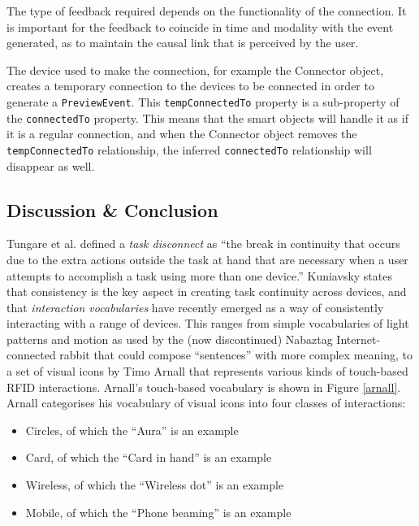 The type of feedback required depends on the functionality of the connection. It is important for the feedback to coincide in time and modality with the event generated, as to maintain the causal link that is perceived by the user.

The device used to make the connection, for example the Connector object, creates a temporary connection to the devices to be connected in order to generate a \texttt{PreviewEvent}. This \texttt{tempConnectedTo} property is a sub-property of the \texttt{connectedTo} property. This means that the smart objects will handle it as if it is a regular connection, and when the Connector object removes the \texttt{tempConnectedTo} relationship, the inferred \texttt{connectedTo} relationship will disappear as well.


\subsection{Discussion \& Conclusion}

Tungare et al. \cite{Tungare2007} defined a \emph{task disconnect} as ``the break in continuity that occurs due to the extra actions outside the task at hand that are necessary when a user attempts to accomplish a task using more than one device.'' Kuniavsky \cite{Kuniavsky} states that consistency is the key aspect in creating task continuity across devices, and that \emph{interaction vocabularies} have recently emerged as a way of consistently interacting with a range of devices. This ranges from simple vocabularies of light patterns and motion as used by the (now discontinued) Nabaztag Internet-connected rabbit that could compose ``sentences'' with more complex meaning, to a set of visual icons by Timo Arnall \cite{Arnall2006} that represents various kinds of touch-based RFID interactions. Arnall's touch-based vocabulary is shown in Figure \ref{arnall}. Arnall categorises his vocabulary of visual icons into four classes of interactions: 

\begin{itemize}
	\item Circles, of which the ``Aura'' is an example
	\item Card, of which the ``Card in hand'' is an example
	\item Wireless, of which the ``Wireless dot'' is an example
	\item Mobile, of which the ``Phone beaming'' is an example
\end{itemize}

